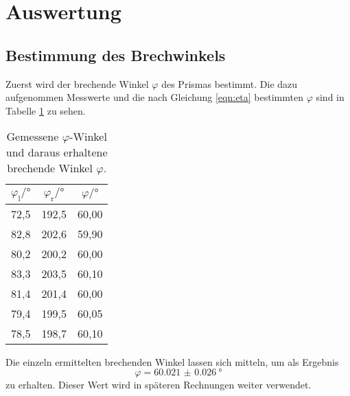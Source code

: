 \section{Auswertung}
\label{sec:Auswertung}
\subsection{Bestimmung des Brechwinkels}
\label{subsec:brechwinkel}
Zuerst wird der brechende Winkel $\varphi$ des Prismas bestimmt.
Die dazu aufgenommen Messwerte und die nach Gleichung \eqref{eqn:eta}
bestimmten $\varphi$ sind in Tabelle \ref{tab:phi} zu sehen.

\begin{table}[htp]
	\begin{center}
    \caption{Gemessene $\varphi$-Winkel und daraus erhaltene brechende Winkel $\varphi$.}
    \label{tab:phi}
		\begin{tabular}{ccc}
		\toprule
			{$\varphi_\text{l}/°$} & {$\varphi_\text{r}/°$} & {$\varphi/°$} \\
			\midrule
      72,5 & 192,5 & 60,00 \\
      82,8 & 202,6 & 59,90 \\
      80,2 & 200,2 & 60,00 \\
      83,3 & 203,5 & 60,10 \\
      81,4 & 201,4 & 60,00 \\
      79,4 & 199,5 & 60,05 \\
      78,5 & 198,7 & 60,10 \\
		\bottomrule
		\end{tabular}
	\end{center}
\end{table}

Die einzeln ermittelten brechenden Winkel lassen sich mitteln, um als Ergebnis
\begin{equation*}
  \varphi = \SI{60.021(26)}{\degree}
\end{equation*}
zu erhalten. Dieser Wert wird in späteren Rechnungen weiter verwendet.

